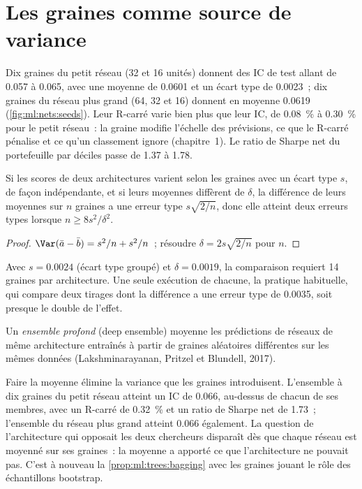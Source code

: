 \section{Les graines comme source de variance}

Dix graines du petit réseau (32 et 16 unités) donnent des IC de test allant de 0.057 à 0.065, avec une moyenne de 0.0601 et un
écart type de 0.0023~; dix graines du réseau plus grand (64, 32 et 16) donnent en moyenne 0.0619 (\cref{fig:ml:nets:seeds}).
Leur R-carré varie bien plus que leur IC, de 0.08~\% à 0.30~\% pour le petit réseau~: la graine modifie l'échelle des
prévisions, ce que le R-carré pénalise et ce qu'un classement ignore (chapitre~1). Le ratio de Sharpe net du portefeuille par déciles passe
de 1.37 à 1.78.

\begin{proposition}\label{prop:ml:nets:seeds}
Si les scores de deux architectures varient selon les graines avec un écart type $s$, de façon indépendante, et si leurs moyennes diffèrent de
$\delta$, la différence de leurs moyennes sur $n$ graines a une erreur type $s\sqrt{2/n}$, donc elle atteint deux erreurs types
lorsque $n \ge 8s^2/\delta^2$.
\end{proposition}

\begin{proof}
$\Var(\bar a - \bar b) = s^2/n + s^2/n$~; résoudre $\delta = 2s\sqrt{2/n}$ pour $n$.
\end{proof}

Avec $s = 0.0024$ (écart type groupé) et $\delta = 0.0019$, la comparaison requiert 14 graines par architecture. Une seule exécution de chacune,
la pratique habituelle, qui compare deux tirages dont la différence a une erreur type de 0.0035, soit presque le double de l'effet.

\begin{definition}\label{def:ml:neural-networks-for-noisy-tabular-data:ensemble}
Un \emph{ensemble profond} (deep ensemble) moyenne les prédictions de réseaux de même architecture entraînés à partir de
graines aléatoires différentes sur les mêmes données (Lakshminarayanan, Pritzel et Blundell, 2017).
\end{definition}

Faire la moyenne élimine la variance que les graines introduisent. L'ensemble à dix graines du petit réseau atteint un IC de 0.066, au-dessus
de chacun de ses membres, avec un R-carré de 0.32~\% et un ratio de Sharpe net de 1.73~; l'ensemble du réseau plus grand
atteint 0.066 également. La question de l'architecture qui opposait les deux chercheurs disparaît dès que chaque réseau
est moyenné sur ses graines~: la moyenne a apporté ce que l'architecture ne pouvait pas. C'est à nouveau la \cref{prop:ml:trees:bagging}
avec les graines jouant le rôle des échantillons bootstrap.

